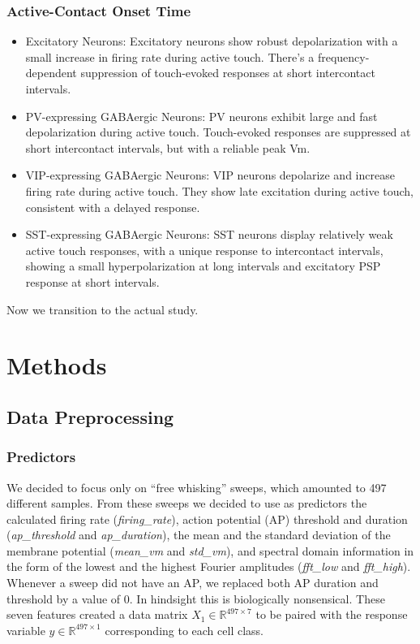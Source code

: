 \documentclass{IEEEtran}
\begin{document}
\subsubsection*{Active-Contact Onset Time}

\begin{itemize}
    \item Excitatory Neurons: Excitatory neurons show robust depolarization with a small increase in firing rate during active touch. There's a frequency-dependent suppression of touch-evoked responses at short intercontact intervals.
    
    \item PV-expressing GABAergic Neurons: PV neurons exhibit large and fast depolarization during active touch. Touch-evoked responses are suppressed at short intercontact intervals, but with a reliable peak Vm.
    
    \item VIP-expressing GABAergic Neurons: VIP neurons depolarize and increase firing rate during active touch. They show late excitation during active touch, consistent with a delayed response.
    
    \item SST-expressing GABAergic Neurons: SST neurons display relatively weak active touch responses, with a unique response to intercontact intervals, showing a small hyperpolarization at long intervals and excitatory PSP response at short intervals.
\end{itemize}

Now we transition to the actual study.


\section{Methods}

\subsection{Data Preprocessing}
\subsubsection{Predictors}

We decided to focus only on “free whisking” sweeps, which amounted to 497 different samples.
From these sweeps we decided to use as predictors the calculated firing rate (\textit{firing\_rate}), action potential (AP) threshold and duration (\textit{ap\_threshold} and \textit{ap\_duration}), the mean and the standard deviation of the membrane potential (\textit{mean\_vm} and \textit{std\_vm}), and spectral domain information in the form of the lowest and the highest Fourier amplitudes (\textit{fft\_low} and \textit{fft\_high}).
Whenever a sweep did not have an AP, we replaced both AP duration and threshold by a value of 0. In hindsight this is biologically nonsensical.
These seven features created a data matrix $X_1 \in \mathbb{R}^{497\times7}$ to be paired with the response variable $y \in \mathbb{R}^{497\times1}$ corresponding to each cell class.
\end{document}
